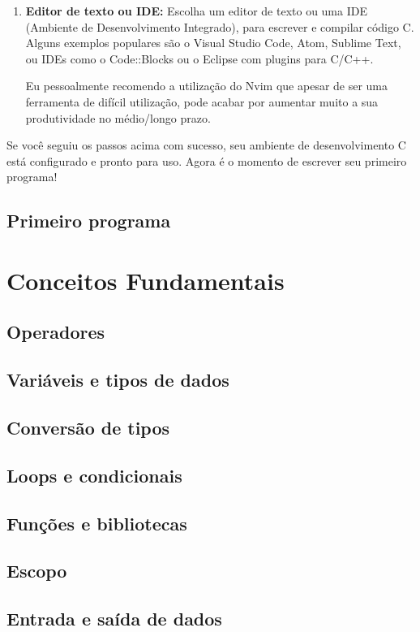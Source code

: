 \documentclass{book}
\begin{document}
\begin{enumerate}
    \item \textbf{Editor de texto ou IDE:} 
        Escolha um editor de texto ou uma IDE (Ambiente de Desenvolvimento Integrado), 
        para escrever e compilar código C. Alguns exemplos populares são o Visual 
        Studio Code, Atom, Sublime Text, ou IDEs como o Code::Blocks ou o Eclipse 
        com plugins para C/C++.

        {\tiny Eu pessoalmente recomendo a utilização do Nvim que apesar de ser 
        uma ferramenta de difícil utilização, pode acabar por aumentar muito a sua 
        produtividade no médio/longo prazo.}
\end{enumerate}

Se você seguiu os passos acima com sucesso, seu ambiente de desenvolvimento 
C está configurado e pronto para uso. Agora é o momento de escrever seu 
primeiro programa!

\subsection{Primeiro programa}

\section{Conceitos Fundamentais}
\subsection{Operadores}
\subsection{Variáveis e tipos de dados}
\subsection{Conversão de tipos}
\subsection{Loops e condicionais}
\subsection{Funções e bibliotecas}
\subsection{Escopo}
\subsection{Entrada e saída de dados}
\end{document}
